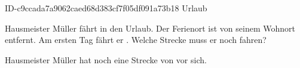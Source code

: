 \begin{exercise}
      {ID-c9ccada7a9062caed68d383cf7f05df091a73b18}
      {Urlaub}
  \ifproblem\problem\par
    Hausmeister Müller fährt in den Urlaub. Der Ferienort ist  von seinem
    Wohnort entfernt. Am ersten Tag fährt er . Welche Strecke muss er noch
    fahren?
  \fi
  \ifoutcome\outcome\par
    Hausmeister Müller hat noch eine Strecke von  vor sich.
  \fi
\end{exercise}
